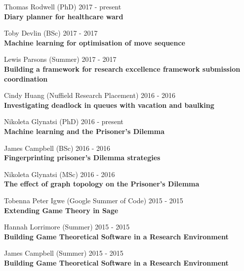 \documentclass[10pt]{res} %
\begin{document}
\begin{resume}
\begin{etaremune}
\item
    Thomas Rodwell (PhD) \hfill 2017 -
    present\\
\textbf{Diary planner for healthcare ward}\\

\item
    Toby Devlin (BSc) \hfill 2017 -
    2017\\
\textbf{Machine learning for optimisation of move sequence}\\

\item
    Lewis Parsons (Summer) \hfill 2017 -
    2017\\
\textbf{Building a framework for research excellence framework submission coordination}\\

\item
    Cindy Huang (Nuffield Research Placement) \hfill 2016 -
    2016\\
\textbf{Investigating deadlock in queues with vacation and baulking}\\

\item
    Nikoleta Glynatsi (PhD) \hfill 2016 -
    present\\
\textbf{Machine learning and the Prisoner's Dilemma}\\

\item
    James Campbell (BSc) \hfill 2016 -
    2016\\
\textbf{Fingerprinting prisoner's Dilemma strategies}\\

\item
    Nikoleta Glynatsi (MSc) \hfill 2016 -
    2016\\
\textbf{The effect of graph topology on the Prisoner's Dilemma}\\

\item
    Tobenna Peter Igwe (Google Summer of Code) \hfill 2015 -
    2015\\
\textbf{Extending Game Theory in Sage}\\

\item
    Hannah Lorrimore (Summer) \hfill 2015 -
    2015\\
\textbf{Building Game Theoretical Software in a Research Environment}\\

\item
    James Campbell (Summer) \hfill 2015 -
    2015\\
\textbf{Building Game Theoretical Software in a Research Environment}\\


\end{etaremune}
\end{resume}
\end{document}

